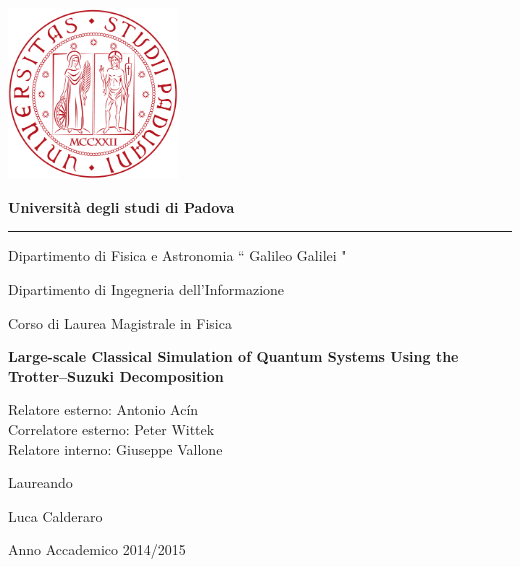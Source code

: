 \begin{titlepage}

\setlength{}
\setlength{}

\begin{center}
\vspace*{-2. cm}
\includegraphics[width=4.5cm]{Figs/Logo_Universita_Padova.png}
\vspace*{1 cm}

{\bfseries{\huge Universit\`a degli studi di Padova} }
\hrule

\vspace{1 cm}

{\Large Dipartimento di Fisica e Astronomia  `` Galileo Galilei "} 

\vspace{0.5cm}

{\Large Dipartimento di Ingegneria dell'Informazione} 
\vspace{1cm}

{\Large Corso di Laurea Magistrale in} 
{\Large Fisica}

\vspace{1.5 cm}

{\LARGE{\bfseries {Large-scale Classical Simulation of Quantum Systems Using the Trotter--Suzuki Decomposition}}} 
\end{center}

\vfill
\raggedright     
\large{Relatore esterno: Antonio Acín}  \\
\vspace{0.08cm}
\large{Correlatore esterno: Peter Wittek}  \\
\vspace{0.08 cm}
\large{Relatore interno: Giuseppe Vallone}  \\
\vspace{0.08cm}

\raggedleft
\large{Laureando}

\large{Luca Calderaro} 

\vspace{2cm}
\begin{center}
{\large{ Anno Accademico 2014/2015}}
\end{center}
\vspace{-1.5cm}

\end{titlepage}